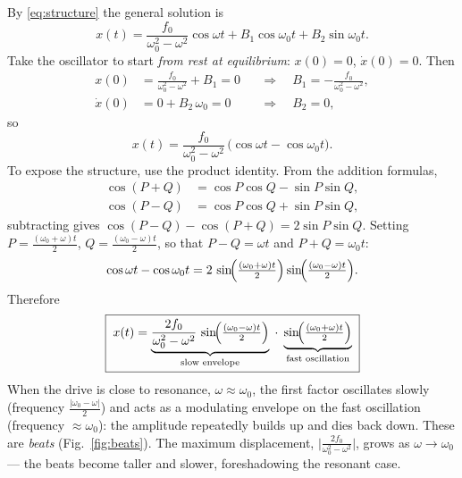 \documentclass[11pt]{article}
\theoremstyle{plain}
\theoremstyle{definition}
\theoremstyle{remark}
\begin{document}
By \eqref{eq:structure} the general solution is
\begin{equation}
  x(t) = \frac{f_0}{\omega_0^2-\omega^2}\cos\omega t
       + B_1 \cos\omega_0 t + B_2 \sin\omega_0 t .
\end{equation}
Take the oscillator to start \emph{from rest at equilibrium}:
$x(0)=0$, $\dot x(0)=0$. Then
\begin{align}
  x(0) &= \frac{f_0}{\omega_0^2-\omega^2} + B_1 = 0
  &&\Longrightarrow\quad B_1 = -\frac{f_0}{\omega_0^2-\omega^2}, \\
  \dot x(0) &= 0 + B_2\,\omega_0 = 0
  &&\Longrightarrow\quad B_2 = 0,
\end{align}
so
\begin{equation}
  x(t) = \frac{f_0}{\omega_0^2 - \omega^2}\,
  \bigl(\cos\omega t - \cos\omega_0 t\bigr).
  \label{eq:beats-raw}
\end{equation}
To expose the structure, use the product identity. From the addition
formulas,
\begin{align}
  \cos(P+Q) &= \cos P\cos Q - \sin P \sin Q, \\
  \cos(P-Q) &= \cos P\cos Q + \sin P \sin Q,
\end{align}
subtracting gives $\cos(P-Q)-\cos(P+Q) = 2\sin P\sin Q$. Setting
$P = \tfrac{(\omega_0+\omega)t}{2}$, $Q = \tfrac{(\omega_0-\omega)t}{2}$, so
that $P-Q = \omega t$ and $P+Q = \omega_0 t$:
\begin{equation}
  \cos\omega t - \cos\omega_0 t
  = 2\,\sin\!\Bigl(\tfrac{(\omega_0+\omega)t}{2}\Bigr)
      \sin\!\Bigl(\tfrac{(\omega_0-\omega)t}{2}\Bigr).
\end{equation}
Therefore
\begin{equation}
  \boxed{\;
  x(t) = \underbrace{\frac{2f_0}{\omega_0^2-\omega^2}\,
  \sin\!\Bigl(\tfrac{(\omega_0-\omega)t}{2}\Bigr)}_{\text{slow envelope}}
  \;\cdot\;
  \underbrace{\sin\!\Bigl(\tfrac{(\omega_0+\omega)t}{2}\Bigr)}_{\text{fast oscillation}}
  \;}
  \label{eq:beats}
\end{equation}
When the drive is close to resonance, $\omega\approx\omega_0$, the first
factor oscillates slowly (frequency $\tfrac{|\omega_0-\omega|}{2}$) and acts
as a modulating envelope on the fast oscillation (frequency
$\approx\omega_0$): the amplitude repeatedly builds up and dies back down.
These are \emph{beats} (Fig.~\ref{fig:beats}). The maximum displacement,
$\bigl|\tfrac{2f_0}{\omega_0^2-\omega^2}\bigr|$, grows as
$\omega\to\omega_0$ --- the beats become taller and slower, foreshadowing the
resonant case.
\end{document}
